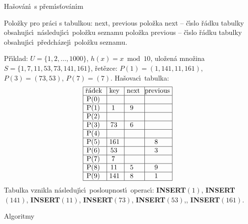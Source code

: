 \heading
Ha\v sov\'an\'\i\ s p\v rem\'\i s\v tov\'an\'\i m
\endheading

\flushpar Polo\v zky pro pr\'aci s tabulkou: next, previous\newline 
\phantom{---}polo\v zka next -- \v c\'\i slo \v r\'adku tabulky 
obsahuj\'\i c\'\i\ n\'asleduj\'\i c\'\i\ polo\v z\-ku seznamu\newline 
\phantom{---}polo\v zka previous -- \v c\'\i slo \v r\'adku tabulky obsahuj\'\i c\'\i\ 
p\v redch\'azej\'\i\ polo\v zku seznamu.
\medskip

\flushpar P\v r\'\i klad: $U=\{1,2,\dots,1000\}$, $h(x)=x\bmod10$,\newline 
ulo\v zen\'a mno\v zina $S=\{1,7,11,53,73,141,161\}$,\newline 
\v ret\v ezce: $P(1)=(1,141,11,161)$, 
$P(3)=(73,53)$, $P(7)=(7)$.\newline 
Ha\v sovac\'\i\ tabulka:
$$\vtop{\offinterlineskip\halign {\strut\vrule\ # & \vrule\ # & \vrule\ # & \vrule \hfil # \hfil \vrule\cr\noalign{\hrule}\v r\'adek & key & next & previous\hfil \cr\noalign{\hrule}P(0) & & & \hfill \cr\noalign{\hrule}P(1) & 1 & 9 & \hfill \cr\noalign{\hrule}P(2) & & & \hfill \cr\noalign{\hrule}P(3) & 73 & 6 & \hfill \cr\noalign{\hrule}P(4) & & &\hfill \cr\noalign{\hrule}P(5) & 161 & & 8 \cr\noalign{\hrule}P(6) & 53 & & 3 \cr\noalign{\hrule}P(7) & 7 & &\hfill \cr\noalign{\hrule}P(8) & 11 & 5 & 9 \cr\noalign{\hrule}P(9) & 141 & 8 & 1 \cr\noalign{\hrule}}}$$
\flushpar Tabulka vznikla n\'asleduj\'\i c\'\i\ posloupnost\'\i\ 
operac\'\i :\newline 
{\bf INSERT$(1)$}, {\bf INSERT$(141)$}, {\bf INSERT$(11)$}, {\bf INSERT$(73)$}, 
{\bf INSERT$(53)$},, {\bf INSERT$(161)$}. 
\medskip

\subhead
Algoritmy
\endsubhead
\smallskip


